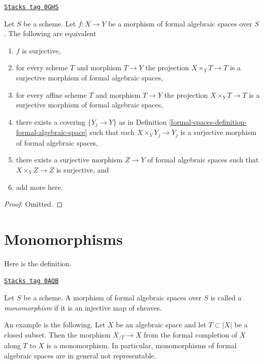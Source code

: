 \begin{lemma}
\label{formal-spaces-lemma-characterize-surjective}
\href{https://stacks.math.columbia.edu/tag/0GHS}{\texttt{Stacks tag 0GHS}}

Let $S$ be a scheme. Let $f : X \to Y$ be a morphism of formal algebraic
spaces over $S$. The following are equivalent
\begin{enumerate}
\item $f$ is surjective,
\item for every scheme $T$ and morphism $T \to Y$
the projection $X \times_Y T \to T$ is a surjective morphism
of formal algebraic spaces,
\item for every affine scheme $T$ and morphism $T \to Y$
the projection $X \times_Y T \to T$ is a surjective morphism of formal
algebraic spaces,
\item there exists a covering $\{Y_j \to Y\}$ as in
Definition \ref{formal-spaces-definition-formal-algebraic-space}
such that each $X \times_Y Y_j \to Y_j$ is a surjective morphism of
formal algebraic spaces,
\item there exists a surjective morphism $Z \to Y$
of formal algebraic spaces such that $X \times_Y Z \to Z$ is surjective, and
\item add more here.
\end{enumerate}
\end{lemma}

\begin{proof}
Omitted.
\end{proof}

\section{Monomorphisms}
\label{formal-spaces-section-monomorphisms}
Here is the definition.

\begin{definition}[Monomorphism]
\label{formal-spaces-definition-monomorphism}
\href{https://stacks.math.columbia.edu/tag/0AQB}{\texttt{Stacks tag 0AQB}}

Let $S$ be a scheme.
A morphism of formal algebraic spaces over $S$ is called a
{\it monomorphism} if it is an injective map of sheaves.
\end{definition}

An example is the following. Let $X$ be an algebraic space and let
$T \subset |X|$ be a closed subset. Then the morphism
$X_{/T} \to X$ from the formal completion of $X$ along $T$ to $X$
is a monomorphism. In particular, monomorphisms of formal algebraic
spaces are in general not representable.

